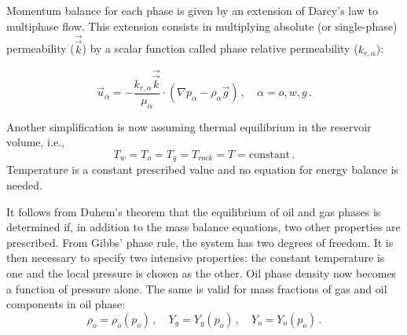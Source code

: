 \documentclass[authoryear,preprint,review,11pt]{elsarticle}
\begin{document}
Momentum balance for each phase is given by an extension of Darcy's law to multiphase flow. This extension consists in multiplying absolute (or single-phase) permeability ($\vec{\vec{k}}$) by a scalar function called phase relative permeability ($k_{r,\alpha}$):

\begin{equation}\label{eq: exdarcy}
\vec{u}_\alpha = -\frac{k_{r,\alpha} \vec{\vec{k}}}{\mu_\alpha}\cdot \left(\nabla p_\alpha - \rho_\alpha \vec{g}\right) \, , \quad \alpha=o,w,g \, .
\end{equation}


Another simplification is now assuming thermal equilibrium in the reservoir volume, i.e.,
\begin{equation}
T_w = T_o = T_g = T_{rock} = T = \text{constant} \, .
\end{equation}
Temperature is a constant prescribed value and no equation for energy balance is needed. 


It follows from Duhem's theorem that the equilibrium of oil and gas phases is determined if, in addition to the mass balance equations, two other properties are prescribed. From Gibbs' phase rule, the system has two degrees of freedom. It is then necessary to specify two intensive properties: the constant temperature is one and the local pressure is chosen as the other. Oil phase density now becomes a function of pressure alone. The same is valid for mass fractions of gas and oil components in oil phase:
\begin{equation}
\rho_o = \rho_o \left(p_o\right) \, , \quad Y_g = Y_g (p_o) \, , \quad Y_o = Y_o (p_o) \, .
\end{equation}
\end{document}
